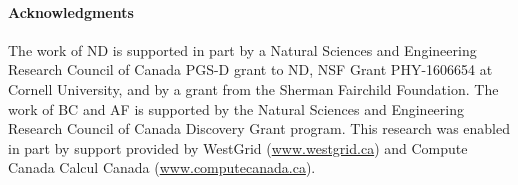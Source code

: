 \documentclass[../PhD.tex]{subfiles}
\begin{document}

\paragraph*{Acknowledgments} The work of ND is supported in part by a Natural Sciences and Engineering
Research Council of Canada PGS-D grant to ND, NSF Grant PHY-1606654 at Cornell University, and by a grant from the Sherman Fairchild Foundation. The work of BC and AF is supported by the Natural Sciences and Engineering Research Council of Canada Discovery Grant program. This research was enabled in part by support provided by WestGrid (\href{www.westgrid.ca}{www.westgrid.ca}) and Compute Canada Calcul Canada (\href{www.computecanada.ca}{www.computecanada.ca}).

\end{document}
